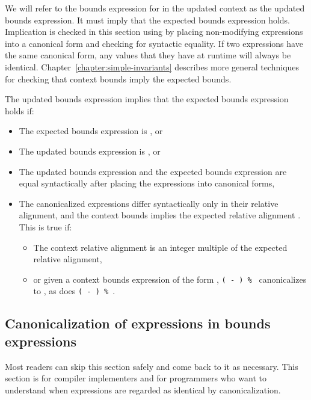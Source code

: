 We will refer to the bounds expression for  in the updated context
as the updated bounds expression.  It must imply that the
expected bounds expression holds. Implication is checked in this section
using by placing non-modifying expressions into a canonical form and
checking for syntactic equality. If two expressions have the same
canonical form, any values that they have at runtime will always be
identical. Chapter~\ref{chapter:simple-invariants}
describes more general techniques for checking
that context bounds imply the expected bounds.

The updated bounds expression implies that the expected bounds
expression holds if:

\begin{itemize}
\item
  The expected bounds expression is \boundsunknown, or
\item
  The updated bounds expression is \boundsany, or
\item
  The updated bounds expression and the expected bounds expression are
  equal syntactically after placing the expressions into canonical
  forms,
\item
  The canonicalized expressions
  differ syntactically only in their relative alignment, and
  the context bounds implies the expected relative alignment .
  This is true if:

  \begin{itemize}
  \item
    The context relative alignment is an integer multiple of the
    expected relative alignment,
  \item
   or given a context bounds expression of the form
   ,
   \texttt{( - ) \% }
   canonicalizes to , as does
   \texttt{( - ) \% }.
  \end{itemize}
\end{itemize}

\subsection{Canonicalization of expressions in bounds expressions}
\label{section:canonicalization}

Most readers can skip this section safely and come back to it as
necessary. This section is for compiler implementers and for programmers
who want to understand when expressions are regarded as identical by
canonicalization.

